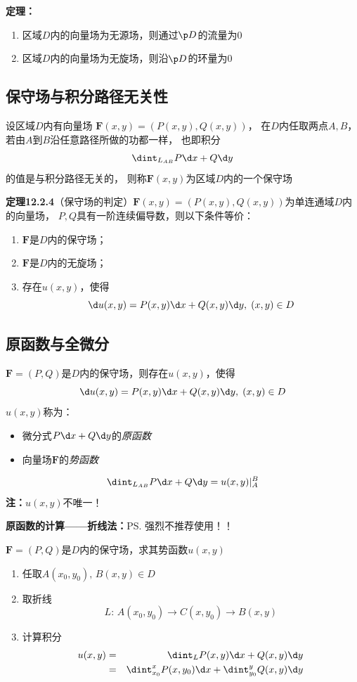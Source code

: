 {\bf 定理：}
\begin{enumerate}[(1)]
  \setlength{\itemindent}{1cm}
  \item 区域$D$内的向量场为无源场，则通过$\p D$的流量为$0$
  \item 区域$D$内的向量场为无旋场，则沿$\p D$的环量为$0$
\end{enumerate}

\subsection{保守场与积分路径无关性}

设区域$D$内有向量场
$\bm{F}(x,y)=(P(x,y),Q(x,y))$，
在$D$内任取两点$A,B$，若由$A$到$B$沿任意路径所做的功都一样，
也即积分
$$\dint_{L_{AB}}P\d x+Q\d y$$
的值是与积分路径无关的，
则称$\bm{F}(x,y)$为区域$D$内的一个保守场

{\bf 定理12.2.4}（保守场的判定）$\bm{F}(x,y)=(P(x,y),Q(x,y))$为单连通域$D$内的向量场，
$P,Q$具有一阶连续偏导数，则以下条件等价：
\begin{enumerate}[(1)]
  \setlength{\itemindent}{1cm}
  \item $\bm{F}$是$D$内的保守场；
  \item $\bm{F}$是$D$内的无旋场；
  \item 存在$u(x,y)$，使得
  $$\d u(x,y)=P(x,y)\d x+Q(x,y)\d y,\;(x,y)\in D$$
\end{enumerate}

\subsection{原函数与全微分}

$\bm{F}=(P,Q)$是$D$内的保守场，则存在$u(x,y)$，使得
$$\d u(x,y)=P(x,y)\d x+Q(x,y)\d y,\;(x,y)\in D$$
 $u(x,y)$称为： 
\begin{itemize}
  \item 微分式$P\d x+Q\d y$的{\it 原函数} 
  \item 向量场$\bm{F}$的{\it 势函数} 
\end{itemize}
\bigskip
$${\dint_{L_{AB}}P\d x+Q\d y=u(x,y)|_A^B} $$
{\bf 注：}$u(x,y)$不唯一！

{\bf 原函数的计算——折线法：}\ps{强烈不推荐使用！！}

$\bm{F}=(P,Q)$是$D$内的保守场，求其势函数$u(x,y)$

\begin{enumerate}[Step-1:]
  \setlength{\itemindent}{1cm}
  \item 任取$A(x_0,y_0),\,B(x,y)\in D$ 
  \item 取折线
  $${L:\,A(x_0,y_0)\to C(x,y_0)\to B(x,y)} $$
  \item 计算积分
  \begin{eqnarray*}
  	u(x,y)&=&\dint_LP(x,y)\d x+Q(x,y)\d y \\
  	&=&{\dint_{x_0}^xP(x,y_0)\d x+\dint_{y_0}^yQ(x,y)\d y}
  \end{eqnarray*}
\end{enumerate}

